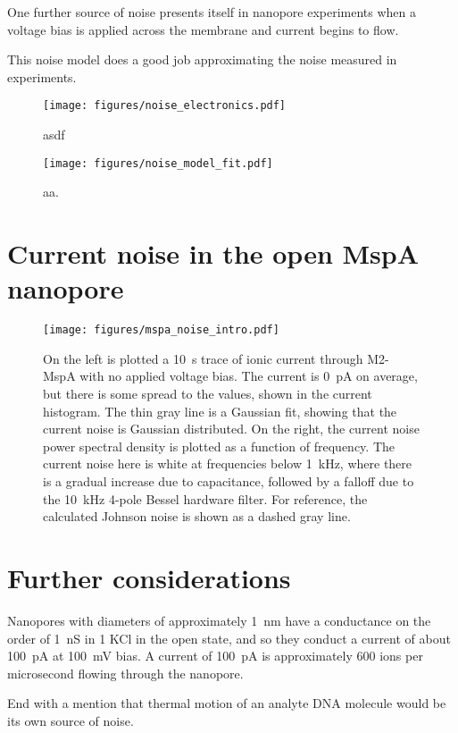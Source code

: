 One further source of noise presents itself in nanopore experiments when a voltage bias is applied across the membrane and current begins to flow.

This noise model does a good job approximating the noise measured in experiments.

\begin{figure}[h]
\begin{centering}
\texttt{[image: figures/noise\_electronics.pdf]}
\caption[Current noise in the MspA nanopore]{asdf}
\label{fig:mspa_noise_intro}
\end{centering}
\end{figure}

\begin{figure}[h]
\begin{centering}
\texttt{[image: figures/noise\_model\_fit.pdf]}
\caption[Current noise in the MspA nanopore]{aa.}
\label{fig:mspa_noise_intro}
\end{centering}
\end{figure}



\section{Current noise in the open MspA nanopore}

\begin{figure}[h]
\begin{centering}
\texttt{[image: figures/mspa\_noise\_intro.pdf]}
\caption[Current noise in the MspA nanopore]{On the left is plotted a \SI{10}{\s} trace of ionic current through M2-MspA with no applied voltage bias.  The current is \SI{0}{\pA} on average, but there is some spread to the values, shown in the current histogram.  The thin gray line is a Gaussian fit, showing that the current noise is Gaussian distributed.  On the right, the current noise power spectral density is plotted as a function of frequency.  The current noise here is white at frequencies below \SI{1}{\kHz}, where there is a gradual increase due to capacitance, followed by a falloff due to the \SI{10}{\kHz} 4-pole Bessel hardware filter.  For reference, the calculated Johnson noise is shown as a dashed gray line.}
\label{fig:mspa_noise_intro}
\end{centering}
\end{figure}

\section{Further considerations}

Nanopores with diameters of approximately \SI{1}{\nm} have a conductance on the order of \SI{1}{\nano\siemens} in \SI{1}{\Molar} KCl in the open state, and so they conduct a current of about \SI{100}{\pA} at \SI{100}{\mV} bias.  A current of \SI{100}{\pA} is approximately \num{600} ions per microsecond flowing through the nanopore.

End with a mention that thermal motion of an analyte DNA molecule would be its own source of noise.